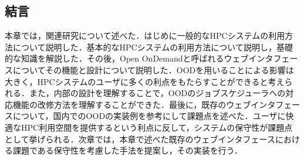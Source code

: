\subsection{結言}
本章では，関連研究について述べた．はじめに一般的なHPCシステムの利用方法について説明した．基本的なHPCシステムの利用方法について説明し，基礎的な知識を解説した．その後，Open OnDemandと呼ばれるウェブインタフェースについてその機能と設計について説明した．OODを用いることによる影響は大きく，HPCシステムのユーザに多くの利点をもたらすことができると考えられる．また，内部の設計を理解することで，OODのジョブスケジューラへの対応機能の改修方法を理解することができた．最後に，既存のウェブインタフェースについて，国内でのOODの実装例を参考にして課題点を述べた．ユーザに快適なHPC利用空間を提供するという利点に反して，システムの保守性が課題点として挙げられる．次章では，本章で述べた既存のウェブインタフェースにおける課題である保守性を考慮した手法を提案し，その実装を行う．\par